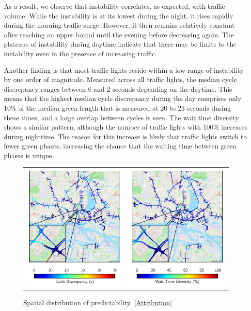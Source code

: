 As a result, we observe that instability correlates, as expected, with traffic volume. While the instability is at its lowest during the night, it rises rapidly during the morning traffic surge. However, it then remains relatively constant after reaching an upper bound until the evening before decreasing again. The plateaus of instability during daytime indicate that there may be limits to the instability even in the presence of increasing traffic. 

Another finding is that most traffic lights reside within a low range of instability by one order of magnitude. Measured across all traffic lights, the median cycle discrepancy ranges between 0 and 2 seconds depending on the daytime. This means that the highest median cycle discrepancy during the day comprises only 10\% of the median green length that is measured at 20 to 23 seconds during these times, and a large overlap between cycles is seen. The wait time diversity shows a similar pattern, although the number of traffic lights with 100\% increases during nighttime. The reason for this increase is likely that traffic lights switch to fewer green phases, increasing the chance that the waiting time between green phases is unique.

\begin{figure}[t]
\centering 
\begin{tabular}{@{}cc@{}}
\includegraphics[width=0.46\linewidth]{images/predictability-map.pdf} & \includegraphics[width=0.46\linewidth]{images/predictability-map-diversity.pdf}
\end{tabular}
\caption{Spatial distribution of predictability. [\hyperref[attribution]{Attribution}]}\label{fig:predictability-map}
\end{figure}

